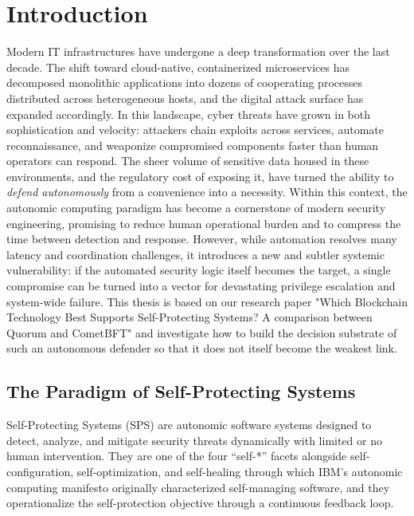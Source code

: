 
\chapter{Introduction}
\label{chap:introduction}

Modern IT infrastructures have undergone a deep transformation over the last decade. The shift toward cloud-native, containerized microservices has decomposed monolithic applications into dozens of cooperating processes distributed across heterogeneous hosts, and the digital attack surface has expanded accordingly. In this landscape, cyber threats have grown in both sophistication and velocity: attackers chain exploits across services, automate reconnaissance, and weaponize compromised components faster than human operators can respond. The sheer volume of sensitive data housed in these environments, and the regulatory cost of exposing it, have turned the ability to \emph{defend autonomously} from a convenience into a necessity. Within this context, the autonomic computing paradigm has become a cornerstone of modern security engineering, promising to reduce human operational burden and to compress the time between detection and response. However, while automation resolves many latency and coordination challenges, it introduces a new and subtler systemic vulnerability: if the automated security logic itself becomes the target, a single compromise can be turned into a vector for devastating privilege escalation and system-wide failure. This thesis is based on our research paper "Which Blockchain Technology Best Supports Self-Protecting Systems? A comparison between Quorum and CometBFT" \cite{albero2026blockchain} and investigate how to build the decision substrate of such an autonomous defender so that it does not itself become the weakest link.

\section{The Paradigm of Self-Protecting Systems}
\label{sec:intro_paradigm}

Self-Protecting Systems (SPS) are autonomic software systems designed to detect, analyze, and mitigate security threats dynamically with limited or no human intervention. They are one of the four ``self-*'' facets alongside self-configuration, self-optimization, and self-healing through which IBM's autonomic computing manifesto \cite{kephart2003vision} originally characterized self-managing software, and they operationalize the self-protection objective through a continuous feedback loop.

